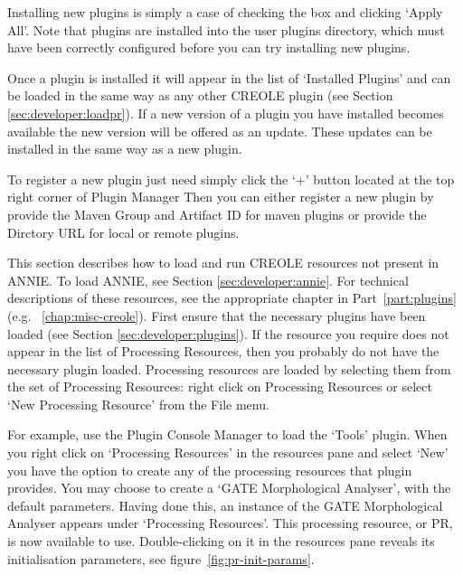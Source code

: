 
Installing new plugins is simply a case of checking the box and clicking `Apply All'.
Note that plugins are installed into the user plugins directory, which must have been
correctly configured before you can try installing new plugins.

Once a plugin is installed it will appear in the list of `Installed Plugins' and can be
loaded in the same way as any other CREOLE plugin (see Section \ref{sec:developer:loadpr}).
If a new version of a plugin you have installed becomes available the new version
will be offered as an update. These updates can be installed in the same way as a new plugin.

To register a new plugin just need simply click the `+' button located at the top right corner of Plugin Manager
Then you can either register a new plugin by provide the Maven Group and Artifact ID for maven plugins or provide the Dirctory URL 
for local or remote plugins.







This section describes how to load and run CREOLE resources not present in ANNIE.
To load ANNIE, see Section \ref{sec:developer:annie}. For technical descriptions
of these resources, see the appropriate chapter in Part~\ref{part:plugins}
(e.g. \Chapthing~\ref{chap:misc-creole}). First ensure that the necessary
plugins have been loaded (see Section \ref{sec:developer:plugins}). If the resource you
require does not appear in the list of Processing Resources, then you probably do
not have the necessary plugin loaded. Processing resources are loaded by
selecting them from the set of Processing Resources: right click on Processing
Resources or select `New Processing Resource' from the File menu.

For example, use the Plugin Console Manager to load the `Tools' plugin. When you
right click on `Processing Resources' in the resources pane and select `New' you
have the option to create any of the processing resources that plugin provides.
You may choose to create a `GATE Morphological Analyser', with the default
parameters. Having done this, an instance of the GATE Morphological Analyser
appears under `Processing Resources'. This processing resource, or PR, is now
available to use. Double-clicking on it in the resources pane reveals its
initialisation parameters, see figure~\ref{fig:pr-init-params}.

